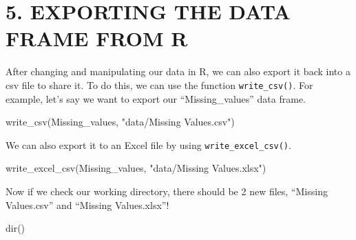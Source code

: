 \documentclass[
]{book}
\newenvironment{Shaded}{\begin{snugshade}}{\end{snugshade}}
\newcommand{\FunctionTok}[1]{\textcolor[rgb]{0.00,0.00,0.00}{#1}}
\newcommand{\NormalTok}[1]{#1}
\newcommand{\StringTok}[1]{\textcolor[rgb]{0.31,0.60,0.02}{#1}}
\begin{document}
\hypertarget{exporting-the-data-frame-from-r}{%
\section{5. EXPORTING THE DATA FRAME FROM R}\label{exporting-the-data-frame-from-r}}

After changing and manipulating our data in R, we can also export it back into a csv file to share it. To do this, we can use the function \texttt{write\_csv()}. For example, let's say we want to export our ``Missing\_values'' data frame.

\begin{Shaded}
\begin{Highlighting}[]
\FunctionTok{write\_csv}\NormalTok{(Missing\_values, }\StringTok{"data/Missing Values.csv"}\NormalTok{)}
\end{Highlighting}
\end{Shaded}

We can also export it to an Excel file by using \texttt{write\_excel\_csv()}.

\begin{Shaded}
\begin{Highlighting}[]
\FunctionTok{write\_excel\_csv}\NormalTok{(Missing\_values, }\StringTok{"data/Missing Values.xlsx"}\NormalTok{)}
\end{Highlighting}
\end{Shaded}

Now if we check our working directory, there should be 2 new files, ``Missing Values.csv'' and ``Missing Values.xlsx''!

\begin{Shaded}
\begin{Highlighting}[]
\FunctionTok{dir}\NormalTok{()}
\end{Highlighting}
\end{Shaded}
\end{document}

